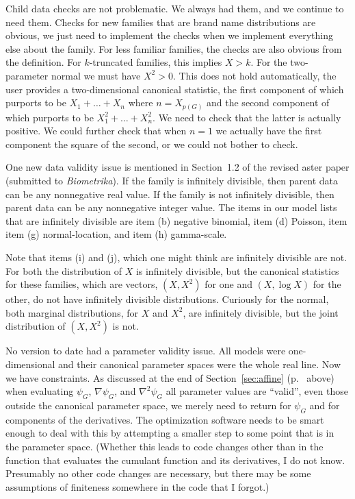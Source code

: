 \documentclass[11pt]{article}
\begin{document}
Child data checks are not problematic.  We always had them, and we continue
to need them.  Checks for new families that are brand name distributions
are obvious, we just need to implement the checks when we implement
everything else about the family.  For less familiar families, the checks
are also obvious from the definition.  For $k$-truncated families,
this implies $X > k$.  For the two-parameter normal we must have $X^2 > 0$.
This does not hold automatically, the user provides
a two-dimensional canonical statistic, the first component of which purports
to be $X_1 + \ldots + X_n$ where $n = X_{p(G)}$ and the second component of
which purports to be $X_1^2 + \ldots + X_n^2$.  We need to check that the
latter is actually positive.
We could further check that when $n = 1$ we actually have the first component
the square of the second, or we could not bother to check.

One new data validity issue is mentioned in Section~1.2 of the
revised aster paper (submitted to \emph{Biometrika}).  If the family
is infinitely divisible, then parent data can be any nonnegative real value.
If the family is not infinitely divisible, then parent data can be any
nonnegative integer value.
The items in our model lists that are infinitely divisible are
item (b) negative binomial,
item (d) Poisson, item item (g) normal-location, and item (h) gamma-scale.

Note that items (i) and (j), which one might think are infinitely divisible
are not.  For both the distribution of $X$ is infinitely divisible, but
the canonical statistics for these families, which are vectors,
$(X, X^2)$ for one and $(X, \log X)$ for the other, do not have
infinitely divisible distributions.  Curiously for the normal,
both marginal distributions, for $X$ and $X^2$, are infinitely divisible,
but the joint distribution of $(X, X^2)$ is not.

No version to date had a parameter validity issue.
All models were one-dimensional and their canonical
parameter spaces were the whole real line.
Now we have constraints.
As discussed at the end of Section~\ref{sec:affine}
(p.~\pageref{pg:regular} above) when evaluating $\psi_G$, $\nabla \psi_G$,
and $\nabla^2 \psi_G$ all parameter values are ``valid'', even those outside
the canonical parameter space, we merely need to return \verb@Inf@ for
$\psi_G$ and \verb@NaN@ for components of the derivatives.
The optimization software needs to be smart enough to deal with this
by attempting a smaller step to some point that is in the parameter space.
(Whether this leads to code changes other than in the function that
evaluates the cumulant function and its derivatives, I do not know.
Presumably no other code changes are necessary, but there may be some
assumptions of finiteness somewhere in the code that I forgot.)
\end{document}
